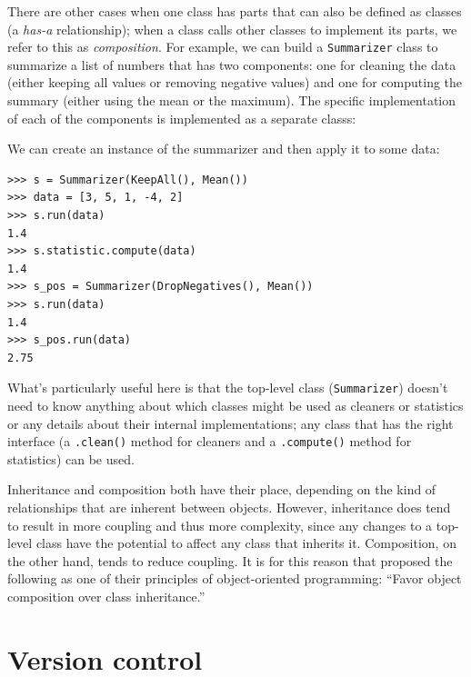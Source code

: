 There are other cases when one class has parts that can also be defined as classes (a \textit{has-a} relationship); when a class calls other classes to implement its parts, we refer to this as \textit{composition}.  For example, we can build a \texttt{Summarizer} class to summarize a list of numbers that has two components: one for cleaning the data (either keeping all values or removing negative values) and one for computing the summary (either using the mean or the maximum).  The specific implementation of each of the components is implemented as a separate classs:



We can create an instance of the summarizer and then apply it to some data:

\begin{lstlisting}[style=repl]
>>> s = Summarizer(KeepAll(), Mean())
>>> data = [3, 5, 1, -4, 2]
>>> s.run(data)
1.4
>>> s.statistic.compute(data)
1.4
>>> s_pos = Summarizer(DropNegatives(), Mean())
>>> s.run(data)
1.4
>>> s_pos.run(data)
2.75
\end{lstlisting}

What's particularly useful here is that the top-level class (\texttt{Summarizer}) doesn't need to know anything about which classes might be used as cleaners or statistics or any details about their internal implementations; any class that has the right interface (a \texttt{.clean()} method for cleaners and a \texttt{.compute()} method for statistics) can be used.  

Inheritance and composition both have their place, depending on the kind of relationships that are inherent between objects.  However, inheritance does tend to result in more coupling and thus more complexity, since any changes to a top-level class have the potential to affect any class that inherits it.  Composition, on the other hand, tends to reduce coupling. It is for this reason that \cite{Gamma:1995aa} proposed the following as one of their principles of object-oriented programming: ``Favor object composition over class inheritance.''

\section{Version control}

